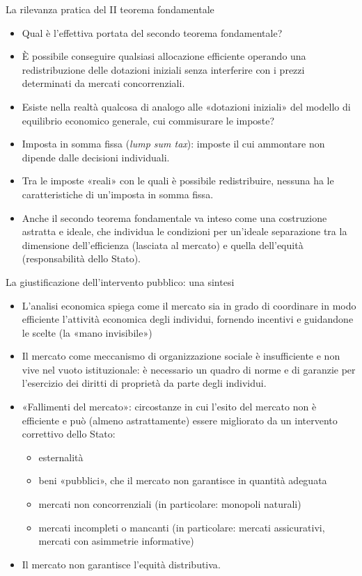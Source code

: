 \documentclass[aspectratio=64,12pt]{beamer}
\begin{document}
\begin{frame}{La rilevanza pratica del II teorema fondamentale}
\begin{itemize}
\item Qual è l’effettiva portata del secondo teorema fondamentale?
\item È possibile conseguire qualsiasi allocazione efficiente operando una redistribuzione delle dotazioni iniziali senza interferire con i prezzi determinati da mercati concorrenziali.
\item  Esiste nella realtà qualcosa di analogo alle «dotazioni iniziali» del modello di equilibrio economico generale, cui commisurare le imposte?
\item \alert{Imposta in somma fissa} (\emph{lump sum tax}): imposte il cui ammontare non dipende dalle decisioni individuali.
\item Tra le imposte «reali» con le quali è possibile redistribuire, nessuna ha le caratteristiche di un’imposta in somma fissa.
\item Anche il secondo teorema fondamentale va inteso come una \alert{costruzione astratta e ideale}, che individua le condizioni per un’ideale separazione tra la dimensione dell’efficienza (lasciata al mercato) e quella dell’equità (responsabilità dello Stato).
\end{itemize}
\end{frame}

\begin{frame}{La giustificazione dell'intervento pubblico: una sintesi}
\begin{itemize}
\item L'analisi economica spiega come il mercato sia in grado di coordinare in
modo efficiente l'attività economica degli individui, fornendo incentivi e
guidandone le scelte (la «mano invisibile»)
\item Il mercato come meccanismo di organizzazione sociale è insufficiente e non
vive nel vuoto istituzionale: è necessario un quadro di norme e di garanzie per
l'esercizio dei diritti di proprietà da parte degli individui.
\item \alert{«Fallimenti del mercato»}: circostanze in cui l'esito del mercato non è
efficiente e può (almeno astrattamente) essere migliorato da un intervento
correttivo dello Stato:
\begin{itemize}
\item esternalità
\item beni «pubblici», che il mercato non garantisce in quantità adeguata
\item mercati non concorrenziali (in particolare: monopoli naturali)
\item mercati incompleti o mancanti (in particolare: mercati assicurativi,
mercati con asimmetrie informative)
\end{itemize}
\item Il mercato non garantisce l'\alert{equità distributiva}.
\end{itemize}
\end{frame}
\end{document}
